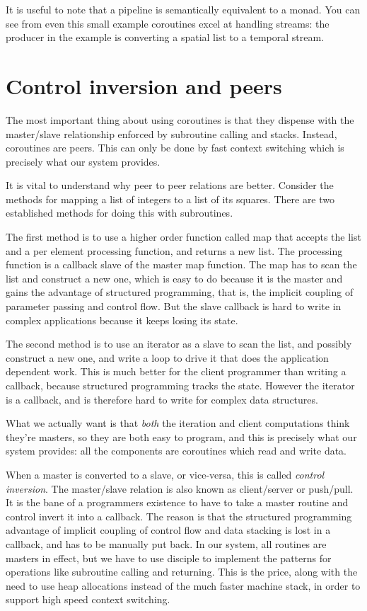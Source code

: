 \documentclass[oneside]{book}
\begin{document}
It is useful to note that a pipeline is semantically equivalent to a monad.
You can see from even this small example coroutines excel at handling streams:
the producer in the example is converting a spatial list to a temporal stream.

\section{Control inversion and peers}
The most important thing about using coroutines is that they dispense
with the master/slave relationship enforced by subroutine calling and stacks.
Instead, coroutines are peers. This can only be done by fast context switching
which is precisely what our system provides.

It is vital to understand why peer to peer relations are better. Consider the methods
for mapping a list of integers to a list of its squares. There are two established
methods for doing this with subroutines.

The first method is to use a higher order function called map that accepts the list
and a per element processing function, and returns a new list. The processing
function is a callback slave of the master map function. The map has to scan
the list and construct a new one, which is easy to do because it is the master
and gains the advantage of structured programming, that is, the implicit coupling
of parameter passing and control flow. But the slave callback is hard to write
in complex applications because it keeps losing its state.

The second method is to use an iterator as a slave to scan the list, and possibly
construct a new one, and write a loop to drive it that does the application
dependent work. This is much better for the client programmer than writing 
a callback, because structured programming tracks the state. However the iterator
is a callback, and is therefore hard to write for complex data structures.

What we actually want is that {\em both} the iteration and client computations
think they're masters, so they are both easy to program, and this is precisely
what our system provides: all the components are coroutines which read and write
data.

When a master is converted to a slave, or vice-versa, this is called
{\em control inversion}. The master/slave relation is also known 
as client/server or push/pull. It is the bane of a programmers existence
to have to take a master routine and control invert it into a callback.
The reason is that the structured programming advantage of implicit coupling
of control flow and data stacking is lost in a callback, and has to be manually
put back. In our system, all routines are masters in effect, but we have to use
disciple to implement the patterns for operations like subroutine calling and returning.
This is the price, along with the need to use heap allocations instead of the much
faster machine stack, in order to support high speed context switching.
\end{document}
